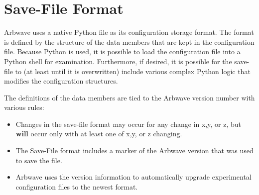 \section{Save-File Format}
Arbwave uses a native Python file as its configuration storage format.  The
format is defined by the structure of the data members that are kept in the
configuration file.  Because Python is used, it is possible to load the
configuration file into a Python shell for examination.  Furthermore, if
desired, it is possible for the save-file to (at least until it is overwritten)
include various complex Python logic that modifies the configuration structures.

The definitions of the data members are tied to the Arbwave version number with
various rules:
\begin{itemize}
  \item Changes in the save-file format may occur for any change in x,y, or z,
        but \textbf{will} occur only with at least one of x,y, or z changing.
  \item The Save-File format includes a marker of the Arbwave version that was
        used to save the file.
  \item Arbwave uses the version information to automatically upgrade
        experimental configuration files to the newest format.
\end{itemize}
